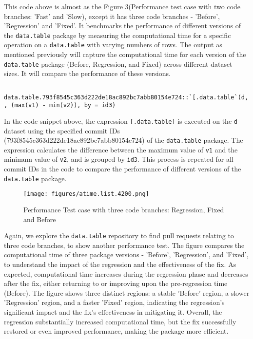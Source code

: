\noindent This code above is almost as the Figure 3(Performance test case with two code branches: 'Fast' and 'Slow), except it has three code branches - 'Before', 'Regression' and 'Fixed'. It benchmarks the performance of different versions of the \texttt{data.table} package by measuring the computational time for a specific operation on a \texttt{data.table} with varying numbers of rows.
The output as mentioned previously will capture the computational time for each version of the \texttt{data.table} package (Before, Regression, and Fixed) across different dataset sizes. It will compare the performance of these versions. \\



    \begin{verbatim}
    data.table.793f8545c363d222de18ac892bc7abb80154e724::`[.data.table`(d, , (max(v1) - min(v2)), by = id3)  
    \end{verbatim}
    
\vspace{0.1in}
\noindent In the code snippet above, the expression \texttt{[.data.table]} is executed on the \texttt{d} dataset using the specified commit IDs (793f8545c363d222de18ac892bc7abb80154e724) of the \texttt{data.table} package. The expression calculates the difference between the maximum value of \texttt{v1} and the minimum value of \texttt{v2}, and is grouped by \texttt{id3}. This process is repeated for all commit IDs in the code to compare the performance of different versions of the \texttt{data.table} package.\\

\begin{figure}[H]
    \centering
    \texttt{[image: figures/atime.list.4200.png]}
    \caption{Performance Test case with three code branches: Regression, Fixed and Before}
    \label{fig:label4}
\end{figure}

\noindent Again, we explore the \texttt{data.table} repository to find pull requests relating to three code branches, to show another performance test. The figure compares the computational time of three package versions - 'Before', 'Regression', and 'Fixed', to understand the impact of the regression and the effectiveness of the fix. As expected, computational time increases during the regression phase and decreases after the fix, either returning to or improving upon the pre-regression time (Before). The figure shows three distinct regions: a stable 'Before' region, a slower 'Regression' region, and a faster 'Fixed' region, indicating the regression's significant impact and the fix's effectiveness in mitigating it. Overall, the regression substantially increased computational time, but the fix successfully restored or even improved performance, making the package more efficient.\\

